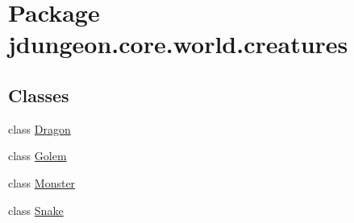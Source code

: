 \hypertarget{namespacejdungeon_1_1core_1_1world_1_1creatures}{
\section{Package jdungeon.core.world.creatures}
\label{namespacejdungeon_1_1core_1_1world_1_1creatures}
}
\subsection*{Classes}
\begin{DoxyCompactItemize}
\item 
class \hyperlink{classjdungeon_1_1core_1_1world_1_1creatures_1_1_dragon}{Dragon}
\item 
class \hyperlink{classjdungeon_1_1core_1_1world_1_1creatures_1_1_golem}{Golem}
\item 
class \hyperlink{classjdungeon_1_1core_1_1world_1_1creatures_1_1_monster}{Monster}
\item 
class \hyperlink{classjdungeon_1_1core_1_1world_1_1creatures_1_1_snake}{Snake}
\end{DoxyCompactItemize}
